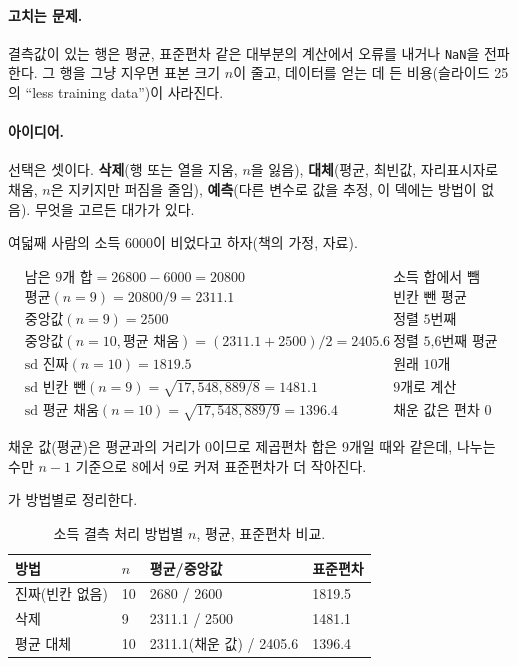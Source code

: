 \paragraph{고치는 문제.} 결측값이 있는 행은 평균, 표준편차 같은 대부분의
계산에서 오류를 내거나 \texttt{NaN}을 전파한다. 그 행을 그냥 지우면
표본 크기 $n$이 줄고, 데이터를 얻는 데 든 비용(슬라이드 25의 ``less
training data'')이 사라진다.

\paragraph{아이디어.} 선택은 셋이다. \textbf{삭제}(행 또는 열을 지움,
$n$을 잃음), \textbf{대체}(평균, 최빈값, 자리표시자로 채움, $n$은
지키지만 퍼짐을 줄임), \textbf{예측}(다른 변수로 값을 추정, 이 덱에는
방법이 없음). 무엇을 고르든 대가가 있다.

\begin{example}[평균 대체의 대가]
\label{ex:qq-impute}
여덟째 사람의 소득 6000이 비었다고 하자(책의 가정, 
자료).

\begin{align*}
  &\text{남은 9개 합} = 26800 - 6000 = 20800 && \text{소득 합에서 뺌}\\
  &\text{평균}(n{=}9) = 20800/9 = 2311.1 && \text{빈칸 뺀 평균}\\
  &\text{중앙값}(n{=}9) = 2500 && \text{정렬 5번째(300..4300)}\\
  &\text{중앙값}(n{=}10,\text{평균 채움}) = (2311.1{+}2500)/2 = 2405.6 && \text{정렬 5,6번째 평균}\\
  &\text{sd 진짜}(n{=}10) = 1819.5 && \text{원래 10개}\\
  &\text{sd 빈칸 뺀}(n{=}9) = \sqrt{17{,}548{,}889/8} = 1481.1 && \text{9개로 계산}\\
  &\text{sd 평균 채움}(n{=}10) = \sqrt{17{,}548{,}889/9} = 1396.4 && \text{채운 값은 편차 0}
\end{align*}

채운 값(평균)은 평균과의 거리가 0이므로 제곱편차 합은 9개일 때와 같은데,
나누는 수만 $n-1$ 기준으로 8에서 9로 커져 표준편차가 더 작아진다.

가 방법별로 정리한다.

\begin{table}[H]\centering
\begin{tabularx}{\linewidth}{@{}l X X X@{}}
\toprule
방법 & $n$ & 평균/중앙값 & 표준편차 \\
\midrule
진짜(빈칸 없음) & 10 & 2680 / 2600 & 1819.5 \\
\midrule
삭제 & 9 & 2311.1 / 2500 & 1481.1 \\
\midrule
평균 대체 & 10 & 2311.1(채운 값) / 2405.6 & 1396.4 \\
\bottomrule
\end{tabularx}
\caption{소득 결측 처리 방법별 $n$, 평균, 표준편차 비교.}
\label{tab:qq-impute}
\end{table}
\end{example}

